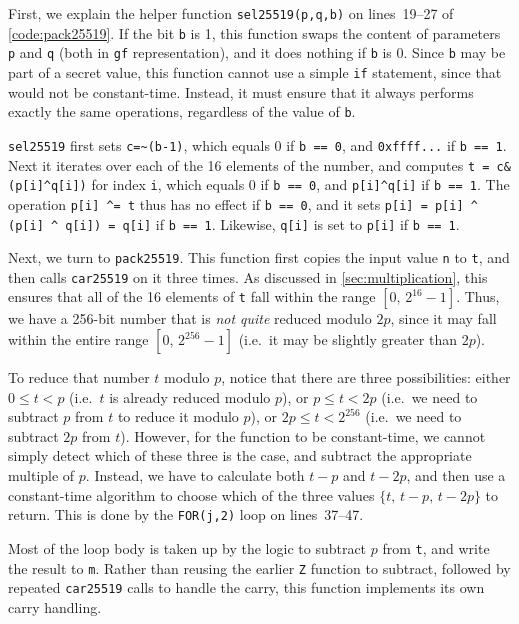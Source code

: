 \documentclass{article}
\begin{document}
First, we explain the helper function \verb|sel25519(p,q,b)| on lines~19--27 of \autoref{code:pack25519}.
If the bit \verb|b| is 1, this function swaps the content of parameters \verb|p| and \verb|q| (both in \verb|gf| representation), and it does nothing if \verb|b| is 0.
Since \verb|b| may be part of a secret value, this function cannot use a simple \verb|if| statement, since that would not be constant-time.
Instead, it must ensure that it always performs exactly the same operations, regardless of the value of \verb|b|.

\verb|sel25519| first sets \verb|c=~(b-1)|, which equals 0 if \verb|b == 0|, and \verb|0xffff...| if \verb|b == 1|.
Next it iterates over each of the 16 elements of the number, and computes \verb|t = c&(p[i]^q[i])| for index \verb|i|, which equals 0 if \verb|b == 0|, and \verb|p[i]^q[i]| if \verb|b == 1|.
The operation \verb|p[i] ^= t| thus has no effect if \verb|b == 0|, and it sets \verb|p[i] = p[i] ^ (p[i] ^ q[i]) = q[i]| if \verb|b == 1|.
Likewise, \verb|q[i]| is set to \verb|p[i]| if \verb|b == 1|.

Next, we turn to \verb|pack25519|.
This function first copies the input value \verb|n| to \verb|t|, and then calls \verb|car25519| on it three times.
As discussed in \autoref{sec:multiplication}, this ensures that all of the 16 elements of \verb|t| fall within the range $[0,\, 2^{16}-1]$.
Thus, we have a 256-bit number that is \emph{not quite} reduced modulo $2p$, since it may fall within the entire range $[0,\, 2^{256}-1]$ (i.e.\ it may be slightly greater than $2p$).

To reduce that number $t$ modulo $p$, notice that there are three possibilities: either $0 \le t < p$ (i.e.\ $t$ is already reduced modulo $p$), or $p \le t < 2p$ (i.e.\ we need to subtract $p$ from $t$ to reduce it modulo $p$), or $2p \le t < 2^{256}$ (i.e.\ we need to subtract $2p$ from $t$).
However, for the function to be constant-time, we cannot simply detect which of these three is the case, and subtract the appropriate multiple of $p$.
Instead, we have to calculate both $t-p$ and $t-2p$, and then use a constant-time algorithm to choose which of the three values $\{t,\, t-p,\, t-2p\}$ to return.
This is done by the \verb|FOR(j,2)| loop on lines~37--47.

Most of the loop body is taken up by the logic to subtract $p$ from \verb|t|, and write the result to \verb|m|.
Rather than reusing the earlier \verb|Z| function to subtract, followed by repeated \verb|car25519| calls to handle the carry, this function implements its own carry handling.
\end{document}
